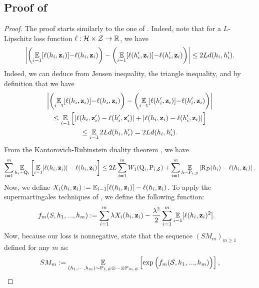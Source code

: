 \begin{noaddcontents}
    \subsection{Proof of }
    \label{sec:proof-online}
    \theoremonline*
    \begin{proof}
    The proof starts similarly to the one of .
    Indeed, note that for a $L$-Lipschitz loss function $\ell: \mathcal{H}\times\mathcal{Z}\to\mathbb{R}$, we have
    \begin{align}
    \left\vert\left( \operatorname*{\mathbb{E}}_{i-1}[\ell(h_i,\mathbf{z}_i)]{-}\ell(h_i, \mathbf{z}_i)\right) - \left( \operatorname*{\mathbb{E}}_{i-1}[\ell(h'_i,\mathbf{z}_i)]{-}\ell(h'_i, \mathbf{z}_i)\right)\right\vert \le 2Ld(h_i, h'_i).\label{eq:proof-online-1}
    \end{align}
    Indeed, we can deduce  from Jensen inequality, the triangle inequality, and by definition that we have
    \begin{multline*}
    \left\vert\left(\operatorname*{\mathbb{E}}_{i-1}[\ell(h_i,\mathbf{z}_i)]{-}\ell(h_i, \mathbf{z}_i)\right) - \left(\operatorname*{\mathbb{E}}_{i-1}[\ell(h'_i,\mathbf{z}_i)]{-}\ell(h'_i, \mathbf{z}_i)\right)\right\vert \\ 
    \le \operatorname*{\mathbb{E}}_{i-1}\Big[ |\ell(h_i, \mathbf{z}'_i)-\ell(h'_i, \mathbf{z}'_i)|+|\ell(h_i, \mathbf{z}_i)-\ell(h'_i, \mathbf{z}_i)|\Big]\\
     \le \operatorname*{\mathbb{E}}_{i-1} 2Ld(h_i, h'_i) = 2Ld(h_i, h'_i).
    \end{multline*}
    From the Kantorovich-Rubinstein duality theorem \cite[Remark 6.5]{villani2009optimal}, we have
    \begin{align*}
    \sum_{i=1}^{m}\operatorname*{\mathbb{E}}_{h_i\sim\mathrm{Q}_{i}}\left[\operatorname*{\mathbb{E}}_{i-1}[\ell(h_i,\mathbf{z}_i)]-\ell(h_i, \mathbf{z}_i) \right] \le 2L\sum_{i=1}^{m}W_1(\mathrm{Q}_{i}, \mathrm{P}_{i,\mathcal{S}}) + \sum_{i=1}^{m}\operatorname*{\mathbb{E}}_{h\sim\mathrm{P}_{i,\mathcal{S}}}\left[\text{R}_{\mathcal{D}}(h_i)-\ell(h_i, \mathbf{z}_i) \right].
    \end{align*}
    Now, we define $X_i(h_i,\mathbf{z}_i):= \operatorname*{\mathbb{E}}_{i-1}[\ell(h_i,\mathbf{z}_i)]- \ell(h_i, \mathbf{z}_i)$. 
    To apply the supermartingales techniques of \cite{chugg2023unified}, we define the following function:
    \begin{align*}
       f_m(S,h_1,...,h_m) & := \sum_{i=1}^m \lambda X_i(h_i,\mathbf{z}_i)  - \frac{\lambda^2}{2}\sum_{i=1}^m \operatorname*{\mathbb{E}}_{i-1}[\ell(h_i, \mathbf{z}_i)^2].
       \end{align*}
        Now, because our loss is nonnegative, \cite[][Lemma A.2 and Lemma B.1]{chugg2023unified} state that the sequence $(SM_m)_{m\geq 1}$ defined for any $m$ as:
        \begin{align*}
        SM_m \defeq \EE_{(h_1,\cdots,h_m) \sim \P_{1,\S} \otimes \cdots \otimes \P_{m,\S}} \LB \exp \Big( f_m(\S,h_1,...,h_m) \Big)  \RB,

\end{align*}
\end{proof}
\end{noaddcontents}
